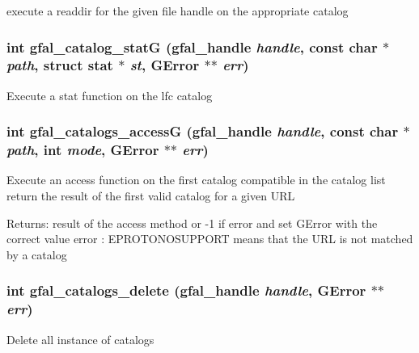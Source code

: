 execute a readdir for the given file handle on the appropriate catalog 
\subsubsection{\setlength{\rightskip}{0pt plus 5cm}int gfal\_\-catalog\_\-stat\-G (gfal\_\-handle {\em handle}, const char $\ast$ {\em path}, struct stat $\ast$ {\em st}, GError $\ast$$\ast$ {\em err})}\label{gfal__common__catalog_8h_28ca68c00e4a67bc158975ef3e4f8013}


Execute a stat function on the lfc catalog 
\subsubsection{\setlength{\rightskip}{0pt plus 5cm}int gfal\_\-catalogs\_\-access\-G (gfal\_\-handle {\em handle}, const char $\ast$ {\em path}, int {\em mode}, GError $\ast$$\ast$ {\em err})}\label{gfal__common__catalog_8h_4fd85b35f2134b73207c12b54e85959d}


Execute an access function on the first catalog compatible in the catalog list return the result of the first valid catalog for a given URL \begin{Desc}
\item[Returns:]result of the access method or -1 if error and set GError with the correct value error : EPROTONOSUPPORT means that the URL is not matched by a catalog \end{Desc}
\subsubsection{\setlength{\rightskip}{0pt plus 5cm}int gfal\_\-catalogs\_\-delete (gfal\_\-handle {\em handle}, GError $\ast$$\ast$ {\em err})}\label{gfal__common__catalog_8h_405974336e7b4ebaafeea02577d7d4d5}


Delete all instance of catalogs 
